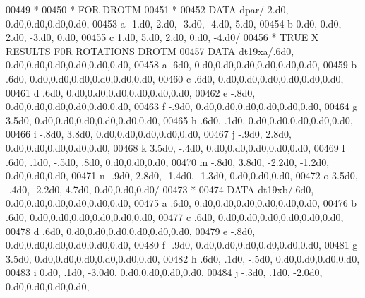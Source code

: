 \begin{DoxyCode}
00449 \textcolor{comment}{*}
00450 \textcolor{comment}{*                         FOR DROTM}
00451 \textcolor{comment}{*}
00452       \textcolor{keyword}{DATA} dpar/-2.d0,  0.d0,0.d0,0.d0,0.d0,
00453      a          -1.d0,  2.d0, -3.d0, -4.d0,  5.d0,
00454      b           0.d0,  0.d0,  2.d0, -3.d0,  0.d0,
00455      c           1.d0,  5.d0,  2.d0,  0.d0, -4.d0/
00456 \textcolor{comment}{*                        TRUE X RESULTS F0R ROTATIONS DROTM}
00457       \textcolor{keyword}{DATA} dt19xa/.6d0,                  0.d0,0.d0,0.d0,0.d0,0.d0,0.d0,
00458      a            .6d0,                  0.d0,0.d0,0.d0,0.d0,0.d0,0.d0,
00459      b            .6d0,                  0.d0,0.d0,0.d0,0.d0,0.d0,0.d0,
00460      c            .6d0,                  0.d0,0.d0,0.d0,0.d0,0.d0,0.d0,
00461      d            .6d0,                  0.d0,0.d0,0.d0,0.d0,0.d0,0.d0,
00462      e           -.8d0,                  0.d0,0.d0,0.d0,0.d0,0.d0,0.d0,
00463      f           -.9d0,                  0.d0,0.d0,0.d0,0.d0,0.d0,0.d0,
00464      g           3.5d0,                  0.d0,0.d0,0.d0,0.d0,0.d0,0.d0,
00465      h            .6d0,   .1d0,             0.d0,0.d0,0.d0,0.d0,0.d0,
00466      i           -.8d0,  3.8d0,             0.d0,0.d0,0.d0,0.d0,0.d0,
00467      j           -.9d0,  2.8d0,             0.d0,0.d0,0.d0,0.d0,0.d0,
00468      k           3.5d0,  -.4d0,             0.d0,0.d0,0.d0,0.d0,0.d0,
00469      l            .6d0,   .1d0,  -.5d0,   .8d0,          0.d0,0.d0,0.d0,
00470      m           -.8d0,  3.8d0, -2.2d0, -1.2d0,          0.d0,0.d0,0.d0,
00471      n           -.9d0,  2.8d0, -1.4d0, -1.3d0,          0.d0,0.d0,0.d0,
00472      o           3.5d0,  -.4d0, -2.2d0,  4.7d0,          0.d0,0.d0,0.d0/
00473 \textcolor{comment}{*}
00474       \textcolor{keyword}{DATA} dt19xb/.6d0,                  0.d0,0.d0,0.d0,0.d0,0.d0,0.d0,
00475      a            .6d0,                  0.d0,0.d0,0.d0,0.d0,0.d0,0.d0,
00476      b            .6d0,                  0.d0,0.d0,0.d0,0.d0,0.d0,0.d0,
00477      c            .6d0,                  0.d0,0.d0,0.d0,0.d0,0.d0,0.d0,
00478      d            .6d0,                  0.d0,0.d0,0.d0,0.d0,0.d0,0.d0,
00479      e           -.8d0,                  0.d0,0.d0,0.d0,0.d0,0.d0,0.d0,
00480      f           -.9d0,                  0.d0,0.d0,0.d0,0.d0,0.d0,0.d0,
00481      g           3.5d0,                  0.d0,0.d0,0.d0,0.d0,0.d0,0.d0,
00482      h            .6d0,   .1d0,  -.5d0,             0.d0,0.d0,0.d0,0.d0,
00483      i           0.d0,    .1d0, -3.0d0,             0.d0,0.d0,0.d0,0.d0,
00484      j           -.3d0,   .1d0, -2.0d0,             0.d0,0.d0,0.d0,0.d0,

\end{DoxyCode}
